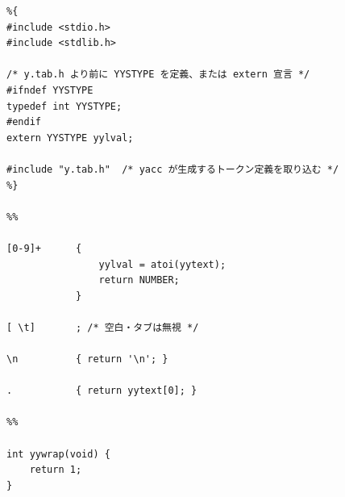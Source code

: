 \documentclass{jarticle}
\begin{document}
\begin{Verbatim}
%{
#include <stdio.h>
#include <stdlib.h>

/* y.tab.h より前に YYSTYPE を定義、または extern 宣言 */
#ifndef YYSTYPE
typedef int YYSTYPE;
#endif
extern YYSTYPE yylval;

#include "y.tab.h"  /* yacc が生成するトークン定義を取り込む */
%}

%%

[0-9]+      {
                yylval = atoi(yytext);
                return NUMBER;
            }

[ \t]       ; /* 空白・タブは無視 */

\n          { return '\n'; }

.           { return yytext[0]; }

%%

int yywrap(void) {
    return 1;
}
\end{Verbatim}
\end{document}

